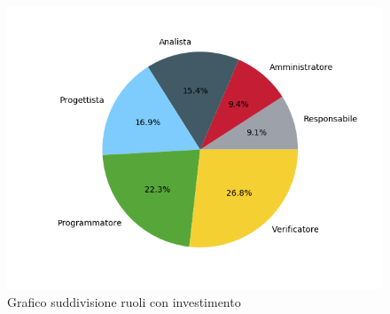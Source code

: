 \begin{figure}[H]
	\centering
  		\includegraphics[width=1\linewidth]{./images/torta_toci.png}
  		\caption{Grafico suddivisione ruoli con investimento}
  		\label{fig:grafico suddivione ruoli con investimento}
\end{figure}



